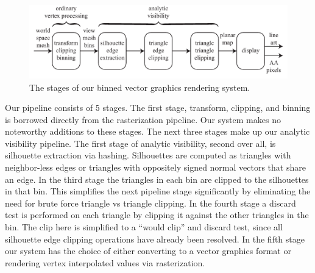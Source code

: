 \documentclass[review]{acmsiggraph}
\begin{document}
\begin{figure}
\includegraphics{images/pipeline.pdf}
\caption{The stages of our binned vector graphics rendering system.}
\label{fig:pipeline}
\end{figure}

Our pipeline consists of 5 stages. The first stage, transform, clipping, and binning is borrowed directly from the rasterization pipeline. Our system makes no noteworthy additions to these stages. The next three stages make up our analytic visibility pipeline. The first stage of analytic visibility, second over all, is silhouette extraction via hashing. Silhouettes are computed as triangles with neighbor-less edges or triangles with oppositely signed normal vectors that share an edge. In the third stage the triangles in each bin are clipped to the silhouettes in that bin.  This simplifies the next pipeline stage significantly by eliminating the need for brute force triangle vs triangle clipping. In the fourth stage a discard test is performed on each triangle by clipping it against the other triangles in the bin. The clip here is simplified to a “would clip” and discard test, since all silhouette edge clipping operations have already been resolved. In the fifth stage our system has the choice of either converting to a vector graphics format or rendering vertex interpolated values via rasterization.
\end{document}
